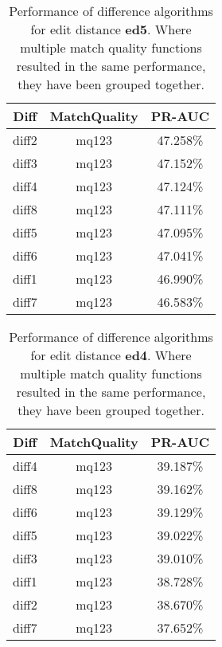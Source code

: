 \begin{table}[tbph]
\begin{center}
\begin{tabular}{|c|c||c|}
\hline
Diff & MatchQuality & PR-AUC  \\
\hline
\hline
diff2 & mq123 & 47.258\% \\
diff3 & mq123 & 47.152\% \\
diff4 & mq123 & 47.124\% \\
diff8 & mq123 & 47.111\% \\
diff5 & mq123 & 47.095\% \\
diff6 & mq123 & 47.041\% \\
diff1 & mq123 & 46.990\% \\
diff7 & mq123 & 46.583\% \\
\hline
\end{tabular}
\end{center}
\caption{Performance of difference algorithms for
  edit distance \textbf{ed5}.  Where multiple match
  quality functions resulted in the same performance, they
  have been grouped together.}
\label{tab:editlongbyed5}
\end{table}
\begin{table}[tbph]
\begin{center}
\begin{tabular}{|c|c||c|}
\hline
Diff & MatchQuality & PR-AUC  \\
\hline
\hline
diff4 & mq123 & 39.187\% \\
diff8 & mq123 & 39.162\% \\
diff6 & mq123 & 39.129\% \\
diff5 & mq123 & 39.022\% \\
diff3 & mq123 & 39.010\% \\
diff1 & mq123 & 38.728\% \\
diff2 & mq123 & 38.670\% \\
diff7 & mq123 & 37.652\% \\
\hline
\end{tabular}
\end{center}
\caption{Performance of difference algorithms for
  edit distance \textbf{ed4}.  Where multiple match
  quality functions resulted in the same performance, they
  have been grouped together.}
\label{tab:editlongbyed4}
\end{table}
